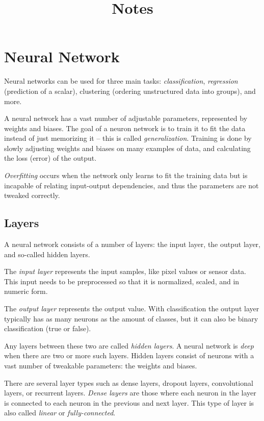 \documentclass[a4paper]{article}
\title{\vspace{-1in}Notes}
\author{}
\date{}
\begin{document}
\maketitle
\vspace{-0.5in}

\section*{Neural Network}
Neural networks can be used for three main tasks: \emph{classification}, \emph{regression} (prediction of a scalar), clustering (ordering unstructured data into groups), and more.

A neural network has a vast number of adjustable parameters, represented by weights and biases. The goal of a neuron network is to train it to fit the data instead of just memorizing it -- this is called \emph{generalization}. Training is done by slowly adjusting weights and biases on many examples of data, and calculating the loss (error) of the output.

\emph{Overfitting} occurs when the network only learns to fit the training data but is incapable of 
relating input-output dependencies, and thus the parameters are not tweaked correctly.

\subsection*{Layers}
A neural network consists of a number of layers: the input layer, the output layer, and so-called hidden layers.

The \emph{input layer} represents the input samples, like pixel values or sensor data. This input needs to be preprocessed so that it is normalized, scaled, and in numeric form.

The \emph{output layer} represents the output value. With classification the output layer typically has as many neurons as the amount of classes, but it can also be binary classification (true or false).

Any layers between these two are called \emph{hidden layers}. A neural network is \emph{deep} when there are two or more such layers. Hidden layers consist of neurons with a vast number of tweakable parameters: the weights and biases. 

There are several layer types such as dense layers, dropout layers, convolutional layers, or recurrent layers. \emph{Dense layers} are those where each neuron in the layer is connected to each neuron in the previous and next layer. This type of layer is also called \emph{linear} or \emph{fully-connected}.
\end{document}
